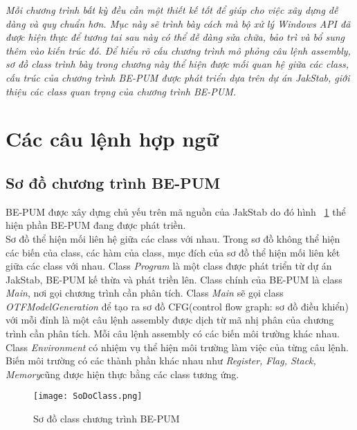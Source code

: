 
\begin{concept}[15cm]
\textit{Mỗi chương trình bất kỳ đều cần một thiết kế tốt để giúp cho việc xây dựng dễ dàng và quy chuẩn hơn. Mục này sẽ trình bày cách mà bộ xử lý Windows API đã được hiện thực để tương tai sau này có thể dễ dàng sửa chữa, bảo trì và bổ sung thêm vào kiến trúc đó. Để hiểu rõ cấu chương trình mô phỏng câu lệnh assembly, sơ đồ class trình bày trong chương này thể hiện được mối quan hệ giữa các class, cấu trúc của chương trình BE-PUM được phát triển dựa trên dự án JakStab, giới thiệu các class quan trọng của chương trình BE-PUM.}
\end{concept}

\section{Các câu lệnh hợp ngữ}
	\subsection{Sơ đồ chương trình BE-PUM}
		BE-PUM được xây dựng chủ yếu trên mã nguồn của JakStab do đó hình ~\ref{fig:SoDoClass} thể hiện phần BE-PUM đang được phát triền. \\

		Sơ đồ thể hiện mối liên hệ giữa các class với nhau. Trong sơ đồ không thể hiện các biến của class, các hàm của class, mục đích của sơ đồ thể hiện mối liên kết giữa các class với nhau. Class \textit{Program} là một class được phát triển từ dự án JakStab, BE-PUM kế thừa và phát triền lên. Class chính của BE-PUM là class \textit{Main}, nơi gọi chương trình cần phân tích. Class \textit{Main} sẽ gọi class \textit{OTFModelGeneration} để tạo ra sơ đồ CFG(control flow graph: sơ đồ điều khiển) với mỗi đỉnh là một câu lệnh assembly được dịch từ mã nhị phân của chương trình cần phân tích. Mỗi câu lệnh assembly có các biến môi trường khác nhau. Class \textit{Environment} có nhiệm vụ thể hiện môi trường làm việc của từng câu lệnh. Biến môi trường có các thành phần khác nhau như \textit{Register, Flag, Stack, Memory}cũng được hiện thực bằng các class tương ứng.
		
		\begin{center}
			\begin{figure}[htp]
				\begin{center}
					\texttt{[image: SoDoClass.png]}
				\end{center}
				\caption{Sơ đồ class chương trình BE-PUM}	
					\label{fig:SoDoClass}		
			\end{figure}
		\end{center}					
		
